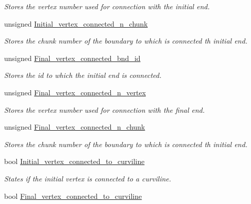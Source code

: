 \begin{DoxyCompactItemize}
\begin{DoxyCompactList}\small\item\em Stores the vertex number used for connection with the initial end. \end{DoxyCompactList}\item 
unsigned \hyperlink{classoomph_1_1TriangleMeshCurveSection_a3b4ca3434467d9890d03633fada52ecf}{Initial\+\_\+vertex\+\_\+connected\+\_\+n\+\_\+chunk}
\begin{DoxyCompactList}\small\item\em Stores the chunk number of the boundary to which is connected th initial end. \end{DoxyCompactList}\item 
unsigned \hyperlink{classoomph_1_1TriangleMeshCurveSection_a3679139caa6192ae3dddcb242ea00fe9}{Final\+\_\+vertex\+\_\+connected\+\_\+bnd\+\_\+id}
\begin{DoxyCompactList}\small\item\em Stores the id to which the initial end is connected. \end{DoxyCompactList}\item 
unsigned \hyperlink{classoomph_1_1TriangleMeshCurveSection_a21d4f42b1f294a237d34302bfecdf63a}{Final\+\_\+vertex\+\_\+connected\+\_\+n\+\_\+vertex}
\begin{DoxyCompactList}\small\item\em Stores the vertex number used for connection with the final end. \end{DoxyCompactList}\item 
unsigned \hyperlink{classoomph_1_1TriangleMeshCurveSection_abbac30e1ecc538c1af17f40184cfe681}{Final\+\_\+vertex\+\_\+connected\+\_\+n\+\_\+chunk}
\begin{DoxyCompactList}\small\item\em Stores the chunk number of the boundary to which is connected th initial end. \end{DoxyCompactList}\item 
bool \hyperlink{classoomph_1_1TriangleMeshCurveSection_a079f9af667c7cb344b53e6a2dcb95f95}{Initial\+\_\+vertex\+\_\+connected\+\_\+to\+\_\+curviline}
\begin{DoxyCompactList}\small\item\em States if the initial vertex is connected to a curviline. \end{DoxyCompactList}\item 
bool \hyperlink{classoomph_1_1TriangleMeshCurveSection_a2a3fa2e4744437410d3a0df32a6d533b}{Final\+\_\+vertex\+\_\+connected\+\_\+to\+\_\+curviline}

\end{DoxyCompactItemize}
